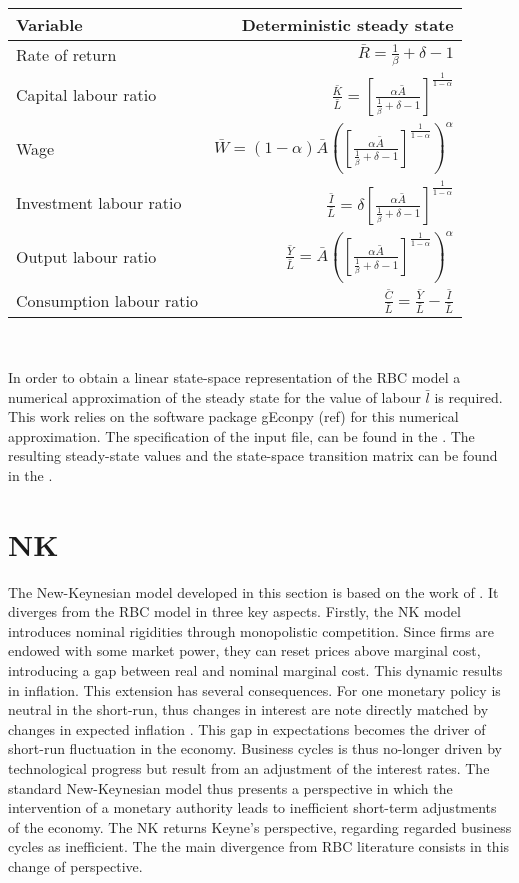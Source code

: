 \documentclass[12pt,a4paper,english]{article} %
\newcommand{\Rss}{\frac{1}{\beta} + \delta - 1}
\newcommand{\Ass}{\bar{A}}
\newcommand{\KLss}{\left[ \frac{\alpha \Ass}{\Rss} \right]^{\frac{1}{1-\alpha}}}
\let\oldsection\section
\renewcommand\section{\clearpage\oldsection}
\begin{document}
	\begin{center}
		\begin{tabular}{lr}
			\textbf{Variable} & \textbf{Deterministic steady state}\\
			\hline 
			Rate of return & $\bar{R} = \Rss$ \\
			Capital labour ratio & $\frac{\bar{K}}{\bar{L}} = \KLss$ \\
			Wage & $\bar{W} = (1 - \alpha) \Ass \left(\KLss\right)^\alpha$ \\
			Investment labour ratio & $\frac{\bar{I}}{\bar{L}} = \delta \KLss$ \\
			Output labour ratio & $\frac{\bar{Y}}{\bar{L}} = \Ass \left(\KLss\right)^\alpha$ \\
			Consumption labour ratio & $\frac{\bar{C}}{\bar{L}} = \frac{\bar{Y}}{\bar{L}} - \frac{\bar{I}}{\bar{L}}$ \\
		\end{tabular}\\
	\end{center}

	In order to obtain a linear state-space representation of the RBC model a numerical approximation of the steady state for the value of labour $\bar{l}$ is required. This work relies on the software package gEconpy (ref) for this numerical approximation. The specification of the input file, can be found in the . The resulting steady-state values and the state-space transition matrix can be found in the . 

	\section{NK} \label{sec:NK}
	The New-Keynesian model developed in this section is based on the work of \cite{gali_monetary_2008}. It diverges from the RBC model in three key aspects.
	Firstly, the NK model introduces nominal rigidities through monopolistic competition. Since firms are endowed with some market power, they can reset prices above marginal cost, introducing a gap between real and nominal marginal cost. This dynamic results in inflation. This extension has several consequences. For one monetary policy is neutral in the short-run, thus changes in interest are note directly matched by changes in expected inflation \cite{gali_monetary_2008}. This gap in expectations becomes the driver of short-run fluctuation in the economy. Business cycles is thus no-longer driven by technological progress but result from an adjustment of the interest rates. The standard New-Keynesian model thus presents a perspective in which the intervention of a monetary authority leads to inefficient short-term adjustments of the economy. The NK returns Keyne's perspective, regarding regarded business cycles as inefficient. The the main divergence from RBC literature consists in this change of perspective.
	
\end{document}
